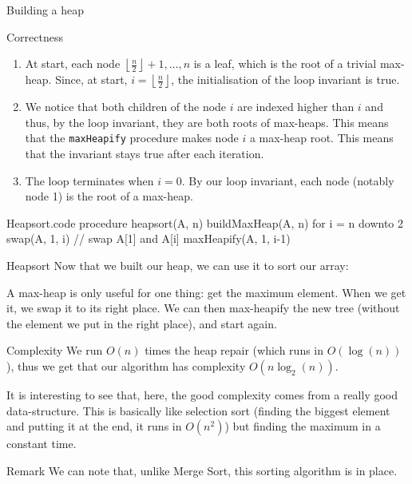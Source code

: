 \documentclass[a4paper]{article}
\begin{document}
\begin{parag}{Building a heap}
\begin{subparag}{Correctness}
        \begin{enumerate}[left=0pt]
            \item At start, each node $\left\lfloor \frac{n}{2} \right\rfloor + 1, \ldots, n $ is a leaf, which is the root of a trivial max-heap. Since, at start, $i = \left\lfloor \frac{n}{2} \right\rfloor $, the initialisation of the loop invariant is true.
            \item We notice that both children of the node $i$ are indexed higher than $i$ and thus, by the loop invariant, they are both roots of max-heaps. This means that the \texttt{maxHeapify} procedure makes node $i$ a max-heap root. This means that the invariant stays true after each iteration.
            \item The loop terminates when $i = 0$. By our loop invariant, each node (notably node 1) is the root of a max-heap.
        \end{enumerate}
    \end{subparag}
\end{parag}

\begin{filecontents*}[overwrite]{Heapsort.code}
procedure heapsort(A, n)
    buildMaxHeap(A, n)
    for i = n downto 2
        swap(A, 1, i)  // swap A[1] and A[i]
        maxHeapify(A, 1, i-1)
\end{filecontents*}

\begin{parag}{Heapsort}
    Now that we built our heap, we can use it to sort our array:

    A max-heap is only useful for one thing: get the maximum element. When we get it, we swap it to its right place. We can then max-heapify the new tree (without the element we put in the right place), and start again.

    \begin{subparag}{Complexity}
        We run $O\left(n\right)$ times the heap repair (which runs in $O\left(\log\left(n\right)\right)$), thus we get that our algorithm has complexity $O\left(n\log_2\left(n\right)\right)$.

        It is interesting to see that, here, the good complexity comes from a really good data-structure. This is basically like selection sort (finding the biggest element and putting it at the end, it runs in $O\left(n^2\right)$) but finding the maximum in a constant time.
    \end{subparag}

    \begin{subparag}{Remark}
        We can note that, unlike Merge Sort, this sorting algorithm is in place.
    \end{subparag}
\end{parag}
\end{document}
